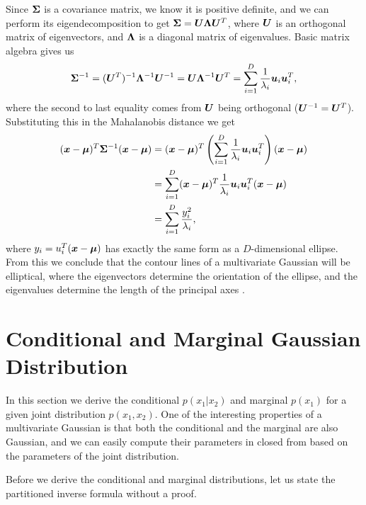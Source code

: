 Since ${\bm{\Sigma}}$ is a covariance matrix, we know it is positive definite, and we
can perform its eigendecomposition to get ${\bm{\Sigma}} = {\bm{U}} {\bm{\Lambda}} {\bm{U}}^T$, where
${\bm{U}}$ is an orthogonal matrix of eigenvectors, and ${\bm{\Lambda}}$ is a diagonal
matrix of eigenvalues. Basic matrix algebra gives us
$$
  {\bm{\Sigma}}^{-1} = ({\bm{U}}^T)^{-1} {\bm{\Lambda}}^{-1} {\bm{U}}^{-1} = {\bm{U}} {\bm{\Lambda}}^{-1}
  {\bm{U}}^T = \sum_{i = 1}^D \frac{1}{\lambda_i} {\boldsymbol{u}}_i {\boldsymbol{u}}_i^T,
$$
where the second to last equality comes from ${\bm{U}}$ being orthogonal (${\bm{U}}^{-1}
= {\bm{U}}^T$).  Substituting this in the Mahalanobis distance we get
\begin{align}
  ({\boldsymbol{x}} - {\boldsymbol{\mu}})^T {\bm{\Sigma}}^{-1} ({\boldsymbol{x}} - {\boldsymbol{\mu}}) &= ({\boldsymbol{x}} - {\boldsymbol{\mu}})^T \left( \sum_{i = 1}^D \frac{1}{\lambda_i} {\boldsymbol{u}}_i {\boldsymbol{u}}_i^T \right) ({\boldsymbol{x}} - {\boldsymbol{\mu}}) \\
                                           &= \sum_{i = 1}^D ({\boldsymbol{x}} - {\boldsymbol{\mu}})^T \frac{1}{\lambda_i} {\boldsymbol{u}}_i {\boldsymbol{u}}_i^T ({\boldsymbol{x}} - {\boldsymbol{\mu}}) \\
                                           &= \sum_{i = 1}^D \frac{y_i^2}{\lambda_i}, \label{eq:mvn-ellipse}
\end{align}
where $y_i = u_i^T ({\boldsymbol{x}} - {\boldsymbol{\mu}})$ has exactly the same form as a $D$-dimensional
ellipse. From this we conclude that the contour lines of a
multivariate Gaussian will be elliptical, where the eigenvectors determine the
orientation of the ellipse, and the eigenvalues determine the length of the
principal axes \citep{bishop2016pattern}.



\section{Conditional and Marginal Gaussian Distribution}

In this section we derive the conditional $p(x_1 | x_2)$ and marginal $p(x_1)$
for a given joint distribution $p(x_1, x_2)$. One of the interesting properties
of a multivariate Gaussian is that both the conditional and the marginal are
also Gaussian, and we can easily compute their parameters in closed from based
on the parameters of the joint distribution.

Before we derive the conditional and marginal distributions, let us state
the partitioned inverse formula without a proof.

